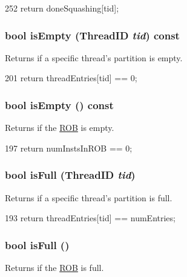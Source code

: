 \begin{DoxyCode}
252     { return doneSquashing[tid]; }
\end{DoxyCode}
\hypertarget{classROB_a1a6e3ff5a958bb55857fcf09f6d26ce7}{
\subsubsection[{isEmpty}]{\setlength{\rightskip}{0pt plus 5cm}bool isEmpty ({\bf ThreadID} {\em tid}) const}}
\label{classROB_a1a6e3ff5a958bb55857fcf09f6d26ce7}
Returns if a specific thread's partition is empty. 


\begin{DoxyCode}
201     { return threadEntries[tid] == 0; }
\end{DoxyCode}
\hypertarget{classROB_a479432127ee77145cc19d6a2d1590821}{
\subsubsection[{isEmpty}]{\setlength{\rightskip}{0pt plus 5cm}bool isEmpty () const}}
\label{classROB_a479432127ee77145cc19d6a2d1590821}
Returns if the \hyperlink{classROB}{ROB} is empty. 


\begin{DoxyCode}
197     { return numInstsInROB == 0; }
\end{DoxyCode}
\hypertarget{classROB_a30fac732df9b3fda011c7329a112cb31}{
\subsubsection[{isFull}]{\setlength{\rightskip}{0pt plus 5cm}bool isFull ({\bf ThreadID} {\em tid})}}
\label{classROB_a30fac732df9b3fda011c7329a112cb31}
Returns if a specific thread's partition is full. 


\begin{DoxyCode}
193     { return threadEntries[tid] == numEntries; }
\end{DoxyCode}
\hypertarget{classROB_a3e70330939fdfc4dbc2f60c1a660584d}{
\subsubsection[{isFull}]{\setlength{\rightskip}{0pt plus 5cm}bool isFull ()}}
\label{classROB_a3e70330939fdfc4dbc2f60c1a660584d}
Returns if the \hyperlink{classROB}{ROB} is full. 


